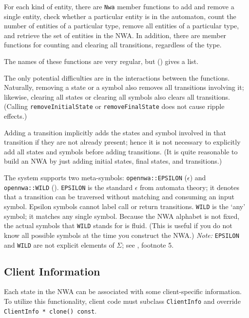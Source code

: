 For each kind of entity, there are \texttt{Nwa} member functions to add and
remove a single entity, check whether a particular entity is in the
automaton, count the number of entities of a particular type, remove all
entities of a particular type, and retrieve the set of entities in the
NWA. In addition, there are member functions for counting and clearing all
transitions, regardless of the type.

The names of these functions are very regular, but
 () gives a list.

The only potential difficulties are in the interactions between the
functions. Naturally, removing a state or a symbol also removes all
transitions involving it; likewise, clearing all states or clearing all symbols
also clears all transitions. (Calling \texttt{removeInitialState} or \texttt{removeFinalState}
does not cause ripple effects.)

Adding a transition implicitly adds the states and symbol involved in that
transition if they are not already present; hence it is not necessary to
explicitly add all states and symbols before adding transitions. (It is quite
reasonable to build an NWA by just adding initial states, final states, and
transitions.)


The system supports two meta-symbols: \texttt{opennwa::EPSILON}
(\texttt{$\epsilon$}) and \texttt{opennwa::WILD} (\texttt{\wild}).
\texttt{EPSILON} is the standard $\epsilon$ from automata theory; it
denotes that a transition can be traversed without matching
and consuming an input symbol.  Epsilon symbols cannot label call or return
transitions. \texttt{WILD} is the `any' symbol; it matches any single
symbol.  Because the NWA alphabet is not fixed, the actual symbols
that \texttt{WILD} stands for is fluid. (This is useful if you do not know
all possible symbols at the time you construct the NWA.)  \textsl{Note:}
\texttt{EPSILON} and \texttt{WILD} are not explicit
elements of $\Sigma$; see , footnote 5.



\subsection{Client Information}
\label{Se:client-info}

Each state in the NWA can be associated with some client-specific
information. To utilize this functionality, client code must subclass
\texttt{ClientInfo} and override \texttt{ClientInfo * clone() const}.

